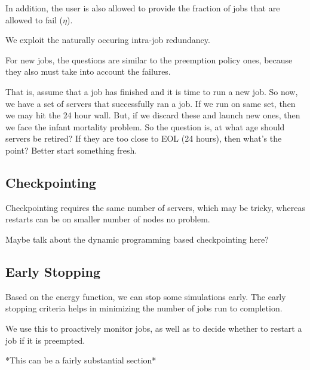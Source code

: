 In addition, the user is also allowed to provide the fraction of jobs that are allowed to fail ($\eta$).

We exploit the naturally occuring intra-job redundancy. 

For new jobs, the questions are similar to the preemption policy ones, because they also must take into account the failures.

That is, assume that a job has finished and it is time to run a new job. So now, we have a set of servers that successfully ran a job. If we run on same set, then we may hit the 24 hour wall. But, if we discard these and launch new ones, then we face the infant mortality problem. So the question is, at what age should servers be retired? If they are too close to EOL (24 hours), then what's the point? Better start something fresh.



\subsection{Checkpointing}

Checkpointing requires the same number of servers, which may be tricky, whereas restarts can be on smaller number of nodes no problem.

Maybe talk about the dynamic programming based checkpointing here?



\subsection{Early Stopping}

Based on the energy function, we can stop some simulations early.
The early stopping criteria helps in minimizing the number of jobs run to completion.

We use this to proactively monitor jobs, as well as to decide whether to restart a job if it is preempted.

*This can be a fairly substantial section*



